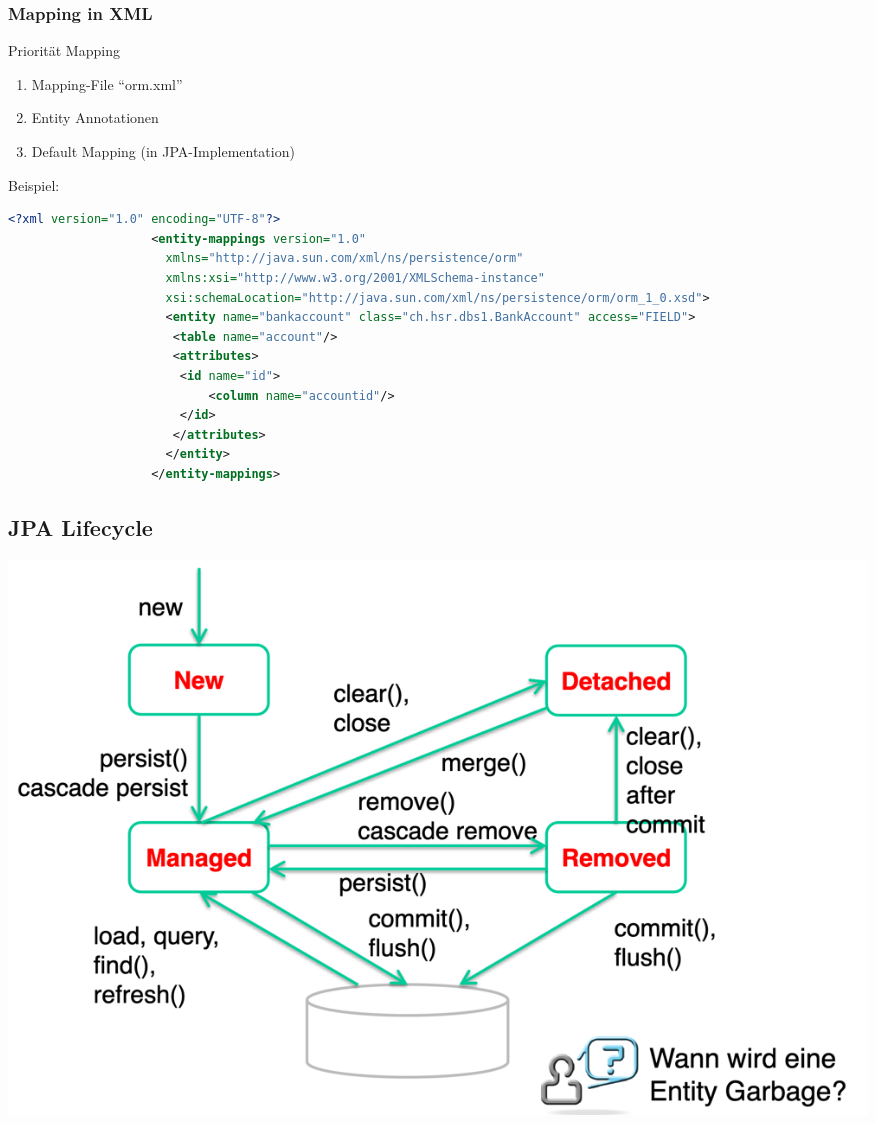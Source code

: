 \documentclass[a4paper, landscape, 8pt]{scrartcl}
\begin{document}
\begin{multicols*}{4}
        \subsubsection{Mapping in XML}
        Priorität Mapping
        \begin{enumerate}
            \item Mapping-File \enquote{orm.xml}
            \item Entity Annotationen
            \item Default Mapping (in JPA-Implementation)
        \end{enumerate}
        Beispiel:
        \begin{lstlisting}[language=xml]
                    <?xml version="1.0" encoding="UTF-8"?>
                    <entity-mappings version="1.0"
                      xmlns="http://java.sun.com/xml/ns/persistence/orm"
                      xmlns:xsi="http://www.w3.org/2001/XMLSchema-instance"
                      xsi:schemaLocation="http://java.sun.com/xml/ns/persistence/orm/orm_1_0.xsd">
                      <entity name="bankaccount" class="ch.hsr.dbs1.BankAccount" access="FIELD">
                       <table name="account"/>
                       <attributes>
                        <id name="id">
                            <column name="accountid"/>
                        </id>
                       </attributes>
                      </entity>
                    </entity-mappings>
        \end{lstlisting}

        \subsection{JPA Lifecycle}
        \includegraphics[scale=0.15]{graphic/00-entity-lifecycle}


\end{multicols*}
\end{document}
